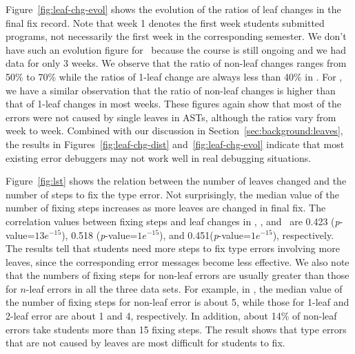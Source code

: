 \documentclass[12pt]{report}	%
\begin{document}
Figure~\ref{fig:leaf-chg-evol} shows the evolution
of the ratios 
of leaf changes in the
final fix record. 
Note that week 1 denotes the
first week students submitted programs, not necessarily the
first week in the corresponding semester.
We don't have such an evolution figure for \benchl\ because the
course is still ongoing and we had data for only 3 weeks.
%
We observe that the ratio of non-leaf changes
ranges from 50\% to 70\%
while the ratios of 1-leaf change are always less than 40\% in \benchs.
For \benchf, we have a similar observation that the ratio of non-leaf changes is higher
than that of 1-leaf changes in most weeks. 
These figures again show that
most of the errors were not caused by single leaves in ASTs,
although the ratios vary from week to week.
Combined with our discussion in Section~\ref{sec:background:leaves},
the results in Figures~\ref{fig:leaf-chg-dist} and~\ref{fig:leaf-chg-evol}
indicate that most existing error debuggers may not work well in
real debugging situations.


Figure~\ref{fig:lst} shows 
the relation between the number of leaves changed and the number of steps to fix the type error.
%
Not surprisingly, the median value of the number of
fixing steps increases as more leaves are changed
in final fix.
The correlation values between fixing steps and leaf changes
in \benchf, \benchs, and \benchl\ are 0.423 (\emph{p}-value=$13e^{-15}$),
0.518 (\emph{p}-value=$1e^{-15}$), and 0.451(\emph{p}-value=$1e^{-15}$), respectively.
The results tell that students need more steps to fix type errors involving more leaves,
since the corresponding error messages become less 
effective.
We also note that the numbers of fixing steps for non-leaf errors
are usually greater than those for $n$-leaf errors in 
all the three data sets.
For example, in \benchs, the median value of the number of 
fixing steps for 
non-leaf error is about 5, while those for 1-leaf and 2-leaf error
are about 1 and 4, respectively.
In addition, about 14\% of non-leaf errors take
students more than 15 fixing steps.
The result shows that type errors
that are not caused by leaves are
most difficult for students to fix.
\end{document}
